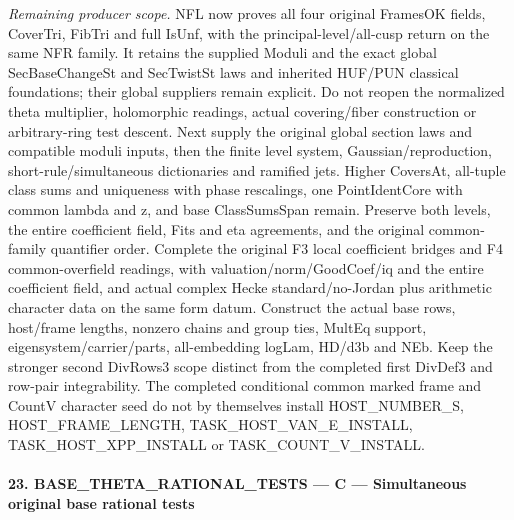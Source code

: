 \documentclass[11pt,a4paper]{article}
\numberwithin{equation}{section}
\theoremstyle{remark}\newtheorem{remark}[theorem]{Remark}
\begin{document}
\emph{Remaining producer scope.} NFL now proves all four original FramesOK fields, CoverTri, FibTri and full IsUnf, with the principal-level/all-cusp return on the same NFR family. It retains the supplied Moduli and the exact global SecBaseChangeSt and SecTwistSt laws and inherited HUF/PUN classical foundations; their global suppliers remain explicit. Do not reopen the normalized theta multiplier, holomorphic readings, actual covering/fiber construction or arbitrary-ring test descent. Next supply the original global section laws and compatible moduli inputs, then the finite level system, Gaussian/reproduction, short-rule/simultaneous dictionaries and ramified jets. Higher CoversAt, all-tuple class sums and uniqueness with phase rescalings, one PointIdentCore with common lambda and z, and base ClassSumsSpan remain. Preserve both levels, the entire coefficient field, Fits and eta agreements, and the original common-family quantifier order. Complete the original F3 local coefficient bridges and F4 common-overfield readings, with valuation/norm/GoodCoef/iq and the entire coefficient field, and actual complex Hecke standard/no-Jordan plus arithmetic character data on the same form datum. Construct the actual base rows, host/frame lengths, nonzero chains and group ties, MultEq support, eigensystem/carrier/parts, all-embedding logLam, HD/d3b and NEb. Keep the stronger second DivRows3 scope distinct from the completed first DivDef3 and row-pair integrability. The completed conditional common marked frame and CountV character seed do not by themselves install HOST\_\allowbreak NUMBER\_\allowbreak S, HOST\_\allowbreak FRAME\_\allowbreak LENGTH, TASK\_\allowbreak HOST\_\allowbreak VAN\_\allowbreak E\_\allowbreak INSTALL, TASK\_\allowbreak HOST\_\allowbreak XPP\_\allowbreak INSTALL or TASK\_\allowbreak COUNT\_\allowbreak V\_\allowbreak INSTALL.



\paragraph{23. BASE\_\allowbreak THETA\_\allowbreak RATIONAL\_\allowbreak TESTS — C — Simultaneous original base rational tests}
\end{document}
